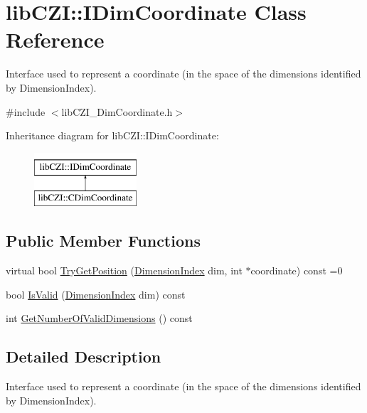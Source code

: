 \hypertarget{classlib_c_z_i_1_1_i_dim_coordinate}{}\section{lib\+C\+ZI\+:\+:I\+Dim\+Coordinate Class Reference}
\label{classlib_c_z_i_1_1_i_dim_coordinate}


Interface used to represent a coordinate (in the space of the dimensions identified by {\ttfamily Dimension\+Index}).  




{\ttfamily \#include $<$lib\+C\+Z\+I\+\_\+\+Dim\+Coordinate.\+h$>$}

Inheritance diagram for lib\+C\+ZI\+:\+:I\+Dim\+Coordinate\+:\begin{figure}[H]
\begin{center}
\leavevmode
\includegraphics[height=2.000000cm]{classlib_c_z_i_1_1_i_dim_coordinate}
\end{center}
\end{figure}
\subsection*{Public Member Functions}
\begin{DoxyCompactItemize}
\item 
virtual bool \hyperlink{classlib_c_z_i_1_1_i_dim_coordinate_a3b1c18f0102bd5635b3cd9cc3fba69d2}{Try\+Get\+Position} (\hyperlink{namespacelib_c_z_i_a55049658acf59d0eddfaebcad16df424}{Dimension\+Index} dim, int $\ast$coordinate) const =0
\item 
bool \hyperlink{classlib_c_z_i_1_1_i_dim_coordinate_a92dbe2ec439f6c5c47102c51955039e0}{Is\+Valid} (\hyperlink{namespacelib_c_z_i_a55049658acf59d0eddfaebcad16df424}{Dimension\+Index} dim) const
\item 
int \hyperlink{classlib_c_z_i_1_1_i_dim_coordinate_af70c2c0edc0ce4cc15de7a5a0b6442bd}{Get\+Number\+Of\+Valid\+Dimensions} () const
\end{DoxyCompactItemize}


\subsection{Detailed Description}
Interface used to represent a coordinate (in the space of the dimensions identified by {\ttfamily Dimension\+Index}). 

